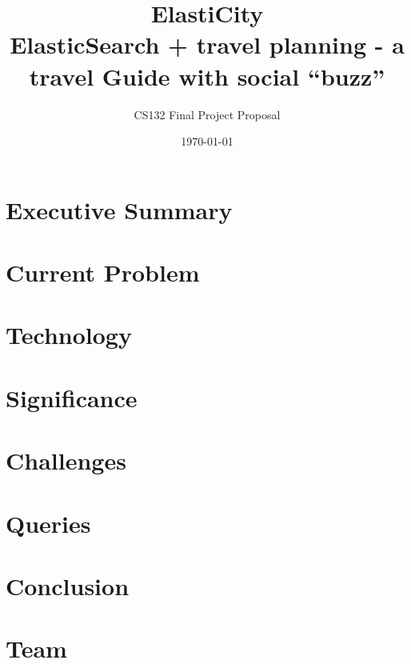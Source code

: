 \documentclass{sty/acm_proc_article-sp}
\begin{document}
\title{ElastiCity \\\vspace{10pt} \large ElasticSearch + travel planning - a travel Guide with social ``buzz''}
\subtitle{CS132 Final Project Proposal}

\author{}

\date{\today}


\maketitle
\section{Executive Summary}
\newpage
\section{Current Problem}

\section{Technology}

\section{Significance}

\section{Challenges}

\section{Queries}
\newpage
\section{Conclusion}

\section{Team}
\end{document}
